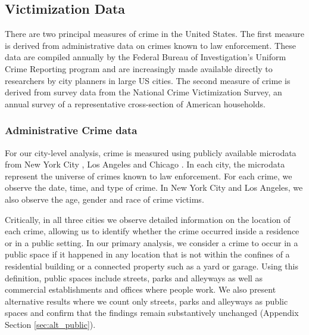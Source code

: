 \documentclass[12pt]{article}
\begin{document}
\subsection{Victimization Data}
There are two principal measures of crime in the United States. The first measure is derived from administrative data on crimes known to law enforcement. These data are compiled annually by the Federal Bureau of Investigation's Uniform Crime Reporting program and are increasingly made available directly to researchers by city planners in large US cities. The second measure of crime is derived from survey data from the National Crime Victimization Survey, an annual survey of a representative cross-section of American households. %

\subsubsection{Administrative Crime data}
For our city-level analysis, crime is measured using publicly available microdata from New York City \citep{nyc_crime_data}, Los Angeles \citep{la_crime_data} and Chicago \citep{chicago_crime_data}. In each city, the microdata represent the universe of crimes known to law enforcement. For each crime, we observe the date, time, and type of crime. In New York City and Los Angeles, we also observe the age, gender and race of crime victims. %

Critically, in all three cities we observe detailed information on the location of each crime, allowing us to identify whether the crime occurred inside a residence or in a public setting. In our primary analysis, we consider a crime to occur in a public space if it happened in any location that is not within the confines of a residential building or a connected property such as a yard or garage. Using this definition, public spaces include streets, parks and alleyways as well as commercial establishments and offices where people work. We also present alternative results where we count only streets, parks and alleyways as public spaces and confirm that the findings remain substantively unchanged (Appendix Section \ref{sec:alt_public}).   
\end{document}
